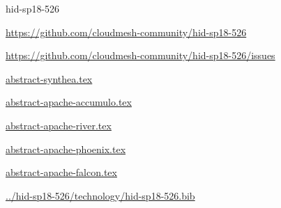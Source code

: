 \begin{IU}

hid-sp18-526

\url{https://github.com/cloudmesh-community/hid-sp18-526}

\url{https://github.com/cloudmesh-community/hid-sp18-526/issues}

\href{https://github.com/cloudmesh-community/hid-sp18-526/blob/master//technology/abstract-synthea.tex}{abstract-synthea.tex}

\href{https://github.com/cloudmesh-community/hid-sp18-526/blob/master//technology/abstract-apache-accumulo.tex}{abstract-apache-accumulo.tex}

\href{https://github.com/cloudmesh-community/hid-sp18-526/blob/master//technology/abstract-apache-river.tex}{abstract-apache-river.tex}

\href{https://github.com/cloudmesh-community/hid-sp18-526/blob/master//technology/abstract-apache-phoenix.tex}{abstract-apache-phoenix.tex}

\href{https://github.com/cloudmesh-community/hid-sp18-526/blob/master//technology/abstract-apache-falcon.tex}{abstract-apache-falcon.tex}

\href{https://github.com/cloudmesh-community/hid-sp18-526/blob/master//technology/hid-sp18-526.bib}{../hid-sp18-526/technology/hid-sp18-526.bib}

\end{IU}



